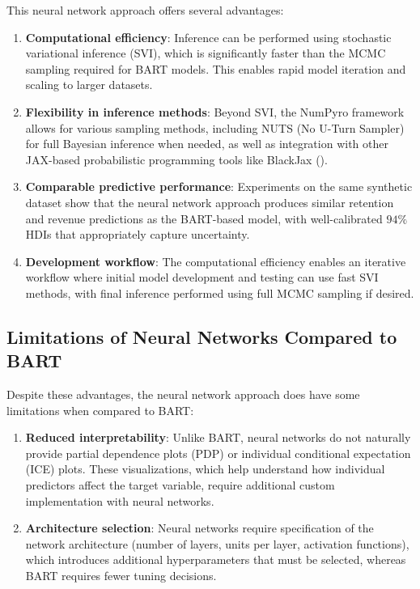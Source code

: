\documentclass[11pt]{amsart}
\theoremstyle{definition}
\begin{document}
This neural network approach offers several advantages:

\begin{enumerate}
    \item \textbf{Computational efficiency}: Inference can be performed using stochastic variational inference (SVI), which
          is significantly faster than the MCMC sampling required for BART models. This enables rapid model iteration and
          scaling to larger datasets.

    \item \textbf{Flexibility in inference methods}: Beyond SVI, the NumPyro framework allows for various sampling methods,
          including NUTS (No U-Turn Sampler) for full Bayesian inference when needed, as well as integration with other
          JAX-based probabilistic programming tools like BlackJax (\cite{cabezas2024blackjax}).

    \item \textbf{Comparable predictive performance}: Experiments on the same synthetic dataset show that the neural network
          approach produces similar retention and revenue predictions as the BART-based model, with well-calibrated $94\%$ HDIs
          that appropriately capture uncertainty.

    \item \textbf{Development workflow}: The computational efficiency enables an iterative workflow where initial model
          development and testing can use fast SVI methods, with final inference performed using full MCMC sampling if desired.
\end{enumerate}

\subsection{Limitations of Neural Networks Compared to BART}

Despite these advantages, the neural network approach does have some limitations when compared to BART:

\begin{enumerate}
    \item \textbf{Reduced interpretability}: Unlike BART, neural networks do not naturally provide partial dependence plots
          (PDP) or individual conditional expectation (ICE) plots. These visualizations, which help understand how individual
          predictors affect the target variable, require additional custom implementation with neural networks.

    \item \textbf{Architecture selection}: Neural networks require specification of the network architecture (number of
          layers, units per layer, activation functions), which introduces additional hyperparameters that must be selected,
          whereas BART requires fewer tuning decisions.
\end{enumerate}
\end{document}

